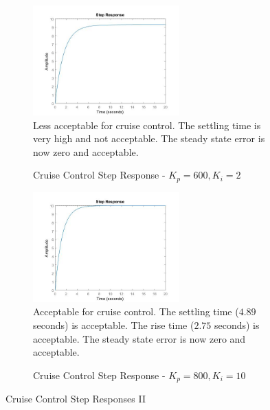 \documentclass[paper=letter, fontsize=11pt]{scrartcl}
\numberwithin{equation}{section}
\numberwithin{figure}{section}
\numberwithin{table}{section}
\begin{document}
\begin{figure}[h]
	\begin{subfigure}{.5\textwidth}
		\centering
	    \includegraphics[height=160px]{graphics/step-kp600-ki2}\\
		Less acceptable for cruise control.
		The settling time is very high and not acceptable.
		The steady state error is now zero and acceptable.
		\caption{Cruise Control Step Response - $K_{p} = 600, K_{i} = 2$}
		\label{fig:step_kp600_ki2}
	\end{subfigure}
	\begin{subfigure}{.5\textwidth}
		\centering
	    \includegraphics[height=160px]{graphics/step-kp800-ki10}\\
		Acceptable for cruise control.
		The settling time ($4.89$ seconds) is acceptable.
		The rise time ($2.75$ seconds) is acceptable.
		The steady state error is now zero and acceptable.
		\caption{Cruise Control Step Response - $K_{p} = 800, K_{i} = 10$}
		\label{fig:step_kp800_ki10}
	\end{subfigure}
	\caption{Cruise Control Step Responses II}
	\label{fig:cc_step_responses_ii}
\end{figure}

\end{document}
